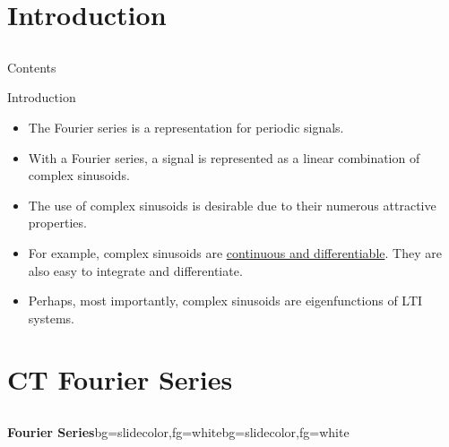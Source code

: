 \section{Introduction}
\subsection{}
\begin{frame}{Contents}
\tableofcontents
\end{frame}


\begin{frame}[label=Lec04_Intro]{Introduction}
\begin{itemize}
\item The Fourier series is a representation for {\color{red}periodic} signals.
\item With a Fourier series, a signal is represented as a {\color{red}linear combination of complex sinusoids}.
\item The use of complex sinusoids is desirable due to their numerous attractive
properties.
\item For example, complex sinusoids are \hyperlink{Lec04_Differentiable}{\color{slidecolor}continuous and differentiable}. They
are also easy to integrate and differentiate.
\item Perhaps, most importantly, complex sinusoids are {\color{red}eigenfunctions} of LTI
systems.
\end{itemize}
\end{frame}

\section{CT Fourier Series}
\subsection{}
\begin{frame}{}
\begin{variableblock}{\centering \Large \textbf{\vspace{4pt}\newline Fourier Series\vspace{4pt}}}{bg=slidecolor,fg=white}{bg=slidecolor,fg=white}
\end{variableblock}
\end{frame}

